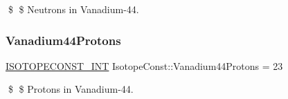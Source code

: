 \$ \$ Neutrons in Vanadium-\/44. \mbox{\label{group___isotope_const-_vanadium-_v44_ga2bb7c208d83ef95143d9f15ab346d200}} 
\subsubsection{\texorpdfstring{Vanadium44\+Protons}{Vanadium44Protons}}
{\footnotesize\ttfamily \mbox{\hyperlink{group___isotope_const-_macros_ga5f18360b3e99483a35c32d789e62621c}{I\+S\+O\+T\+O\+P\+E\+C\+O\+N\+S\+T\+\_\+\+I\+NT}} Isotope\+Const\+::\+Vanadium44\+Protons = 23}

\$ \$ Protons in Vanadium-\/44. 